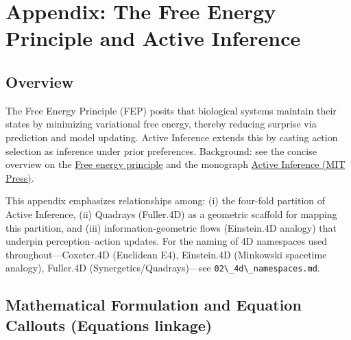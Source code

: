\documentclass[
  10pt,
]{article}
\newcommand{\passthrough}[1]{#1}
\begin{document}
\newpage

\section{Appendix: The Free Energy Principle and Active
Inference}\label{appendix-the-free-energy-principle-and-active-inference}

\subsection{Overview}\label{overview-3}

The Free Energy Principle (FEP) posits that biological systems maintain
their states by minimizing variational free energy, thereby reducing
surprise via prediction and model updating. Active Inference extends
this by casting action selection as inference under prior preferences.
Background: see the concise overview on the
\href{https://en.wikipedia.org/wiki/Free_energy_principle}{Free energy
principle} and the monograph
\href{https://direct.mit.edu/books/oa-monograph/5299/Active-InferenceThe-Free-Energy-Principle-in-Mind}{Active
Inference (MIT Press)}.

This appendix emphasizes relationships among: (i) the four-fold
partition of Active Inference, (ii) Quadrays (Fuller.4D) as a geometric
scaffold for mapping this partition, and (iii) information-geometric
flows (Einstein.4D analogy) that underpin perception--action updates.
For the naming of 4D namespaces used throughout---Coxeter.4D (Euclidean
E4), Einstein.4D (Minkowski spacetime analogy), Fuller.4D
(Synergetics/Quadrays)---see
\passthrough{\lstinline!02\_4d\_namespaces.md!}.

\subsection{Mathematical Formulation and Equation Callouts (Equations
linkage)}\label{mathematical-formulation-and-equation-callouts-equations-linkage}
\end{document}
